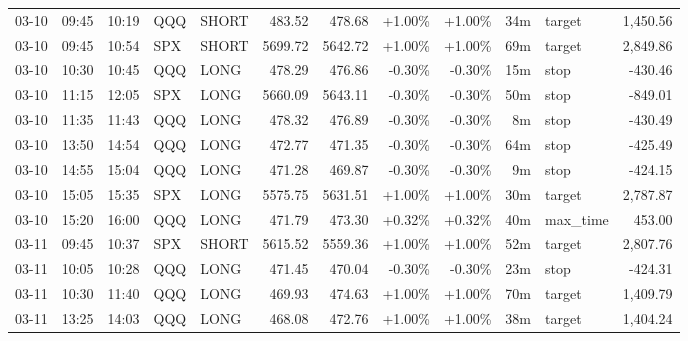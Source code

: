 \documentclass[11pt,a4paper]{article}
\begin{document}
\begin{center}
\begin{longtable}{>{\color{txtmain}}l l l l l r r r r r >{\color{txtmain}}l r}
03-10 & 09:45 & 10:19 & QQQ & SHORT & 483.52 & 478.68 & \textcolor{wingreen}{+1.00\%} & \textcolor{wingreen}{+1.00\%} & 34m & target & \textcolor{wingreen}{1,450.56} \\
03-10 & 09:45 & 10:54 & SPX & SHORT & 5699.72 & 5642.72 & \textcolor{wingreen}{+1.00\%} & \textcolor{wingreen}{+1.00\%} & 69m & target & \textcolor{wingreen}{2,849.86} \\
03-10 & 10:30 & 10:45 & QQQ & LONG & 478.29 & 476.86 & \textcolor{lossred}{-0.30\%} & \textcolor{lossred}{-0.30\%} & 15m & stop & \textcolor{lossred}{-430.46} \\
03-10 & 11:15 & 12:05 & SPX & LONG & 5660.09 & 5643.11 & \textcolor{lossred}{-0.30\%} & \textcolor{lossred}{-0.30\%} & 50m & stop & \textcolor{lossred}{-849.01} \\
03-10 & 11:35 & 11:43 & QQQ & LONG & 478.32 & 476.89 & \textcolor{lossred}{-0.30\%} & \textcolor{lossred}{-0.30\%} & 8m & stop & \textcolor{lossred}{-430.49} \\
03-10 & 13:50 & 14:54 & QQQ & LONG & 472.77 & 471.35 & \textcolor{lossred}{-0.30\%} & \textcolor{lossred}{-0.30\%} & 64m & stop & \textcolor{lossred}{-425.49} \\
03-10 & 14:55 & 15:04 & QQQ & LONG & 471.28 & 469.87 & \textcolor{lossred}{-0.30\%} & \textcolor{lossred}{-0.30\%} & 9m & stop & \textcolor{lossred}{-424.15} \\
03-10 & 15:05 & 15:35 & SPX & LONG & 5575.75 & 5631.51 & \textcolor{wingreen}{+1.00\%} & \textcolor{wingreen}{+1.00\%} & 30m & target & \textcolor{wingreen}{2,787.87} \\
03-10 & 15:20 & 16:00 & QQQ & LONG & 471.79 & 473.30 & \textcolor{wingreen}{+0.32\%} & \textcolor{wingreen}{+0.32\%} & 40m & max\_time & \textcolor{wingreen}{453.00} \\
03-11 & 09:45 & 10:37 & SPX & SHORT & 5615.52 & 5559.36 & \textcolor{wingreen}{+1.00\%} & \textcolor{wingreen}{+1.00\%} & 52m & target & \textcolor{wingreen}{2,807.76} \\
03-11 & 10:05 & 10:28 & QQQ & LONG & 471.45 & 470.04 & \textcolor{lossred}{-0.30\%} & \textcolor{lossred}{-0.30\%} & 23m & stop & \textcolor{lossred}{-424.31} \\
03-11 & 10:30 & 11:40 & QQQ & LONG & 469.93 & 474.63 & \textcolor{wingreen}{+1.00\%} & \textcolor{wingreen}{+1.00\%} & 70m & target & \textcolor{wingreen}{1,409.79} \\
03-11 & 13:25 & 14:03 & QQQ & LONG & 468.08 & 472.76 & \textcolor{wingreen}{+1.00\%} & \textcolor{wingreen}{+1.00\%} & 38m & target & \textcolor{wingreen}{1,404.24} \\

\end{longtable}
\end{center}
\end{document}

